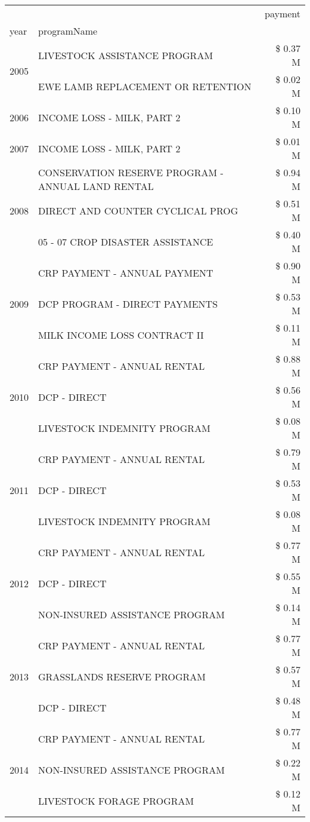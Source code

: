\begin{tabular}{llr}
\toprule
 &  & payment \\
year & programName &  \\
\midrule
\multirow[t]{2}{*}{2005} & LIVESTOCK ASSISTANCE PROGRAM & \$ 0.37 M \\
 & EWE LAMB REPLACEMENT OR RETENTION & \$ 0.02 M \\
\cline{1-3}
2006 & INCOME LOSS - MILK, PART 2 & \$ 0.10 M \\
\cline{1-3}
2007 & INCOME LOSS - MILK, PART 2 & \$ 0.01 M \\
\cline{1-3}
\multirow[t]{3}{*}{2008} & CONSERVATION RESERVE PROGRAM - ANNUAL LAND RENTAL & \$ 0.94 M \\
 & DIRECT AND COUNTER CYCLICAL PROG & \$ 0.51 M \\
 & 05 - 07 CROP DISASTER ASSISTANCE & \$ 0.40 M \\
\cline{1-3}
\multirow[t]{3}{*}{2009} & CRP PAYMENT - ANNUAL PAYMENT & \$ 0.90 M \\
 & DCP PROGRAM - DIRECT PAYMENTS & \$ 0.53 M \\
 & MILK INCOME LOSS CONTRACT II & \$ 0.11 M \\
\cline{1-3}
\multirow[t]{3}{*}{2010} & CRP PAYMENT - ANNUAL RENTAL & \$ 0.88 M \\
 & DCP - DIRECT & \$ 0.56 M \\
 & LIVESTOCK INDEMNITY PROGRAM & \$ 0.08 M \\
\cline{1-3}
\multirow[t]{3}{*}{2011} & CRP PAYMENT - ANNUAL RENTAL & \$ 0.79 M \\
 & DCP - DIRECT & \$ 0.53 M \\
 & LIVESTOCK INDEMNITY PROGRAM & \$ 0.08 M \\
\cline{1-3}
\multirow[t]{3}{*}{2012} & CRP PAYMENT - ANNUAL RENTAL & \$ 0.77 M \\
 & DCP - DIRECT & \$ 0.55 M \\
 & NON-INSURED ASSISTANCE PROGRAM & \$ 0.14 M \\
\cline{1-3}
\multirow[t]{3}{*}{2013} & CRP PAYMENT - ANNUAL RENTAL & \$ 0.77 M \\
 & GRASSLANDS RESERVE PROGRAM & \$ 0.57 M \\
 & DCP - DIRECT & \$ 0.48 M \\
\cline{1-3}
\multirow[t]{3}{*}{2014} & CRP PAYMENT - ANNUAL RENTAL & \$ 0.77 M \\
 & NON-INSURED ASSISTANCE PROGRAM & \$ 0.22 M \\
 & LIVESTOCK FORAGE PROGRAM & \$ 0.12 M \\

\end{tabular}
